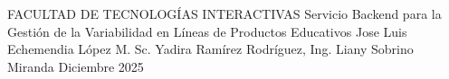 
\portadaUCI
  {FACULTAD DE TECNOLOGÍAS INTERACTIVAS}
  {Servicio Backend para la Gestión de la Variabilidad en Líneas de Productos Educativos}
  {Jose Luis Echemendia López}
  {M. Sc. Yadira Ramírez Rodríguez, Ing. Liany Sobrino Miranda}
  {}      %
  {}      %
  {}      %
  {Diciembre}
  {2025}
